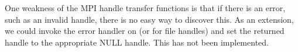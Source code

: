 \documentclass{article}
\begin{document}
One weakness of the MPI handle transfer functions is that if there is
an error, such as an invalid handle, there is no easy way to discover
this.  As an extension, we could invoke the error handler on
 (or  for file handles) and
set the returned handle to the appropriate NULL handle.  This has not
been implemented.

\end{document}
